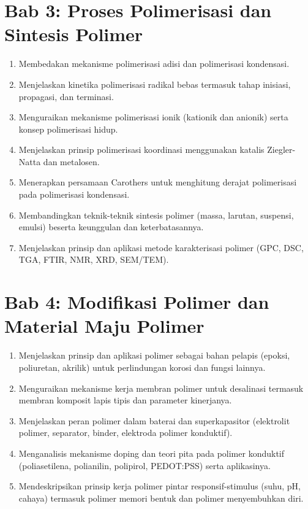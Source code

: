 \documentclass[12pt,a4paper,openany]{book}
\begin{document}
\section*{Bab 3: Proses Polimerisasi dan Sintesis Polimer}
\begin{enumerate}[label=\arabic*.]
  \item Membedakan mekanisme polimerisasi adisi dan polimerisasi kondensasi.
  \item Menjelaskan kinetika polimerisasi radikal bebas termasuk tahap inisiasi, propagasi, dan terminasi.
  \item Menguraikan mekanisme polimerisasi ionik (kationik dan anionik) serta konsep polimerisasi hidup.
  \item Menjelaskan prinsip polimerisasi koordinasi menggunakan katalis Ziegler-Natta dan metalosen.
  \item Menerapkan persamaan Carothers untuk menghitung derajat polimerisasi pada polimerisasi kondensasi.
  \item Membandingkan teknik-teknik sintesis polimer (massa, larutan, suspensi, emulsi) beserta keunggulan dan keterbatasannya.
  \item Menjelaskan prinsip dan aplikasi metode karakterisasi polimer (GPC, DSC, TGA, FTIR, NMR, XRD, SEM/TEM).
\end{enumerate}

\section*{Bab 4: Modifikasi Polimer dan Material Maju Polimer}
\begin{enumerate}[label=\arabic*.]
  \item Menjelaskan prinsip dan aplikasi polimer sebagai bahan pelapis (epoksi, poliuretan, akrilik) untuk perlindungan korosi dan fungsi lainnya.
  \item Menguraikan mekanisme kerja membran polimer untuk desalinasi termasuk membran komposit lapis tipis dan parameter kinerjanya.
  \item Menjelaskan peran polimer dalam baterai dan superkapasitor (elektrolit polimer, separator, binder, elektroda polimer konduktif).
  \item Menganalisis mekanisme doping dan teori pita pada polimer konduktif (poliasetilena, polianilin, polipirol, PEDOT:PSS) serta aplikasinya.
  \item Mendeskripsikan prinsip kerja polimer pintar responsif-stimulus (suhu, pH, cahaya) termasuk polimer memori bentuk dan polimer menyembuhkan diri.
\end{enumerate}
\end{document}
